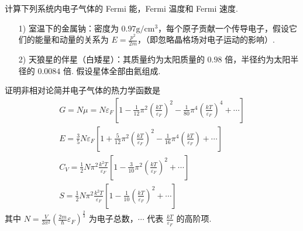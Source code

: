 \documentclass{assignment}
\begin{document}
\begin{prob}
    计算下列系统内电子气体的 Fermi 能，Fermi 温度和 Fermi 速度.
    \begin{itemize}
        \item[1)] 室温下的金属钠：密度为 $0.97\mathrm{g}/\mathrm{cm}^3$，每个原子贡献一个传导电子，假设它们的能量和动量的关系为 $E=\frac{p^2}{2m}$，（即忽略晶格场对电子运动的影响）.
        \item[2)] 天狼星的伴星（白矮星）：其质量约为太阳质量的 $0.98$ 倍，半径约为太阳半径的 $0.0084$ 倍. 假设星体全部由氦组成.
    \end{itemize}
\end{prob}
\begin{sol}
    
\end{sol}

\begin{prob}
    证明非相对论简并电子气体的热力学函数是
    \begin{gather*}
        G=N\mu=N\varepsilon_F\left[1-\frac{1}{12}\pi^2\left(\frac{kT}{\varepsilon_F}\right)^2-\frac{1}{80}\pi^4\left(\frac{kT}{\varepsilon_F}\right)^4+\cdots\right]\\
        E=\frac{3}{5}N\varepsilon_F\left[1+\frac{5}{12}\pi^2\left(\frac{kT}{\varepsilon_F}\right)^2-\frac{1}{16}\pi^4\left(\frac{kT}{\varepsilon_F}\right)+\cdots\right]\\
        C_V=\frac{1}{2}N\pi^2\frac{k^2T}{\varepsilon_F}\left[1-\frac{3}{10}\pi^2\left(\frac{kT}{\varepsilon_F}\right)^2+\cdots\right]\\
        S=\frac{1}{2}N\pi^2\frac{k^2T}{\varepsilon_F}\left[1-\frac{1}{10}\left(\frac{kT}{\varepsilon_F}\right)^2+\cdots\right]
    \end{gather*}
    其中 $N=\frac{V}{3\pi^2}\left(\frac{2m}{\hbar}\varepsilon_F\right)^{\frac{2}{3}}$ 为电子总数，$\cdots$ 代表 $\frac{kT}{\varepsilon_F}$ 的高阶项.
\end{prob}
\begin{pf}
    
\end{pf}
\end{document}
